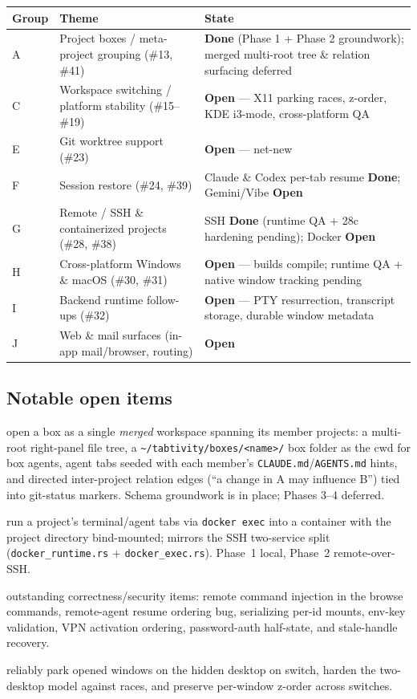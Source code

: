 \documentclass[11pt,a4paper]{article}
\newcommand{\done}{\textcolor{donegreen}{\textbf{Done}}}
\newcommand{\open}{\textcolor{openorange}{\textbf{Open}}}
\newcommand{\code}[1]{\texttt{#1}}
\begin{document}
\begin{longtable}{@{}p{1.6cm}p{7.2cm}p{5.4cm}@{}}
\toprule
\textbf{Group} & \textbf{Theme} & \textbf{State} \\
\midrule
\endhead
A  & Project boxes / meta-project grouping (\#13, \#41) & \done{} (Phase 1 + Phase 2 groundwork); merged multi-root tree \& relation surfacing deferred \\
C  & Workspace switching / platform stability (\#15--\#19) & \open{} --- X11 parking races, z-order, KDE i3-mode, cross-platform QA \\
E  & Git worktree support (\#23) & \open{} --- net-new \\
F  & Session restore (\#24, \#39) & Claude \& Codex per-tab resume \done{}; Gemini/Vibe \open{} \\
G  & Remote / SSH \& containerized projects (\#28, \#38) & SSH \done{} (runtime QA + 28c hardening pending); Docker \open{} \\
H  & Cross-platform Windows \& macOS (\#30, \#31) & \open{} --- builds compile; runtime QA + native window tracking pending \\
I  & Backend runtime follow-ups (\#32) & \open{} --- PTY resurrection, transcript storage, durable window metadata \\
J  & Web \& mail surfaces (in-app mail/browser, routing) & \open{} \\
\bottomrule
\end{longtable}

\subsection{Notable open items}

\begin{description}[leftmargin=1.2em,style=nextline]
  \item[Project box containers (\#41)] open a box as a single \emph{merged}
  workspace spanning its member projects: a multi-root right-panel file tree, a
  \code{\textasciitilde/tabtivity/boxes/<name>/} box folder as the cwd for box
  agents, agent tabs seeded with each member's \code{CLAUDE.md}/\code{AGENTS.md}
  hints, and directed inter-project relation edges (``a change in A may
  influence B'') tied into git-status markers. Schema groundwork is in place;
  Phases 3--4 deferred.
  \item[Docker/Podman projects (\#38)] run a project's terminal/agent tabs via
  \code{docker exec} into a container with the project directory bind-mounted;
  mirrors the SSH two-service split (\code{docker\_runtime.rs} +
  \code{docker\_exec.rs}). Phase~1 local, Phase~2 remote-over-SSH.
  \item[SSH hardening (\#28c)] outstanding correctness/security items: remote
  command injection in the browse commands, remote-agent resume ordering bug,
  serializing per-id mounts, env-key validation, VPN activation ordering,
  password-auth half-state, and stale-handle recovery.
  \item[X11 robustness (\#15--\#17)] reliably park opened windows on the hidden
  desktop on switch, harden the two-desktop model against races, and preserve
  per-window z-order across switches.
\end{description}
\end{document}
